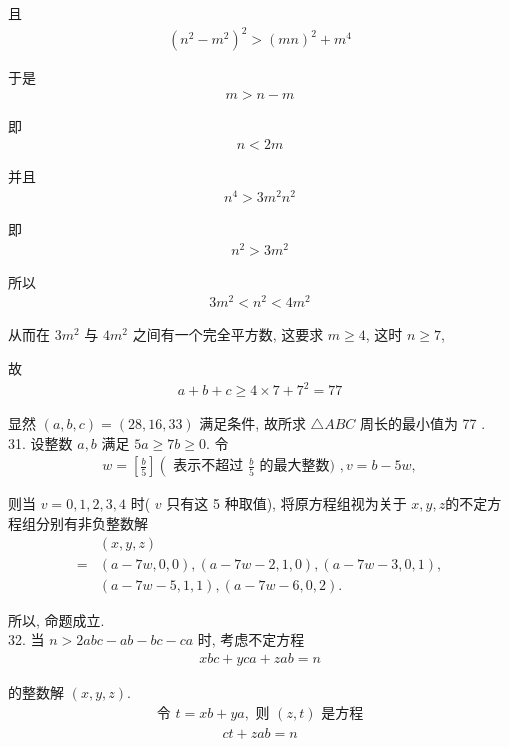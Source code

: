 且
\begin{align*}
	\left(n^{2}-m^{2}\right)^{2}>(m n)^{2}+m^{4}
\end{align*}

于是
\begin{align*}
	m>n-m
\end{align*}

即
\begin{align*}
	n<2 m
\end{align*}

并且
\begin{align*}
	n^{4}>3 m^{2} n^{2}
\end{align*}

即
\begin{align*}
	n^{2}>3 m^{2}
\end{align*}

所以
\begin{align*}
	3 m^{2}<n^{2}<4 m^{2}
\end{align*}

从而在 $3 m^{2}$ 与 $4 m^{2}$ 之间有一个完全平方数, 这要求 $m \geqslant 4$, 这时 $n \geqslant 7$,

故
\begin{align*}
	a+b+c \geqslant 4 \times 7+7^{2}=77
\end{align*}

显然 $(a, b, c)=(28,16,33)$ 满足条件, 故所求 $\triangle A B C$ 周长的最小值为 77 . \\
31. 设整数 $a ,  b$ 满足 $5 a \geqslant 7 b \geqslant 0$. 令
\begin{align*}
	w=\left[\frac{b}{5}\right]\left(\text { 表示不超过 } \frac{b}{5} \text { 的最大整数) }, v=b-5 w,\right.
\end{align*}

则当 $v=0,1,2,3,4$ 时( $v$ 只有这 5 种取值), 将原方程组视为关于 $x ,  y ,  z$的不定方程组分别有非负整数解\begin{align}
	  & (x, y, z)                                 \\
	= & (a-7 w, 0,0),(a-7 w-2,1,0),(a-7 w-3,0,1), \\
	  & (a-7 w-5,1,1),(a-7 w-6,0,2) .
\end{align}

所以, 命题成立.\\
32. 当 $n>2 a b c-a b-b c-c a$ 时, 考虑不定方程
\begin{align*}
	x b c+y c a+z a b=n
\end{align*}

的整数解 $(x, y, z)$.
\begin{align*}
	\text { 令 } t=x b+y a, \text { 则 }(z, t) \text { 是方程 }
\end{align*}
\begin{align*}
	c t+z a b=n
\end{align*}

